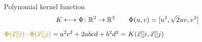 \begin{frame}
\begin{block}{Polynomial kernel function}
\vspace{-15pt}
\begin{equation*}
K \longleftrightarrow \Phi\colon \Bbb{R}^2\rightarrow\Bbb{R}^3 \qquad \Phi(u,v) =  [u^2, \sqrt{2}uv, v^2]
\end{equation*}
$\textcolor{olive}{\Phi(\vLeakVec[]{i})\cdot \Phi(\vLeakVec[]{j})} = a^2c^2 + 2abcd + b^2d^2 = K(\vLeakVec[]{i},\vLeakVec[]{j})$

\end{block}
\end{frame}

